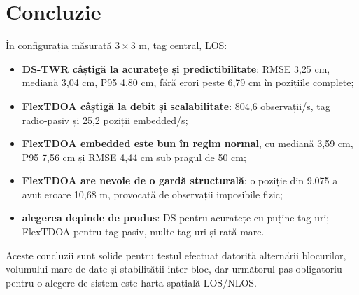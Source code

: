 \documentclass[11pt,a4paper]{article}
\begin{document}
\section{Concluzie}

În configurația măsurată $3\times3$ m, tag central, LOS:

\begin{itemize}[leftmargin=6mm]
  \item \textbf{DS-TWR câștigă la acuratețe și predictibilitate}: RMSE
  3,25 cm, mediană 3,04 cm, P95 4,80 cm, fără erori peste 6,79 cm în pozițiile
  complete;
  \item \textbf{FlexTDOA câștigă la debit și scalabilitate}: 804,6
  observații/s, tag radio-pasiv și 25,2 poziții embedded/s;
  \item \textbf{FlexTDOA embedded este bun în regim normal}, cu mediană
  3,59 cm, P95 7,56 cm și RMSE 4,44 cm sub pragul de 50 cm;
  \item \textbf{FlexTDOA are nevoie de o gardă structurală}: o poziție din
  9.075 a avut eroare 10,68 m, provocată de observații imposibile fizic;
  \item \textbf{alegerea depinde de produs}: DS pentru acuratețe cu puține
  tag-uri; FlexTDOA pentru tag pasiv, multe tag-uri și rată mare.
\end{itemize}

Aceste concluzii sunt solide pentru testul efectuat datorită alternării
blocurilor, volumului mare de date și stabilității inter-bloc, dar următorul
pas obligatoriu pentru o alegere de sistem este harta spațială LOS/NLOS.

\clearpage
\appendix
\end{document}
